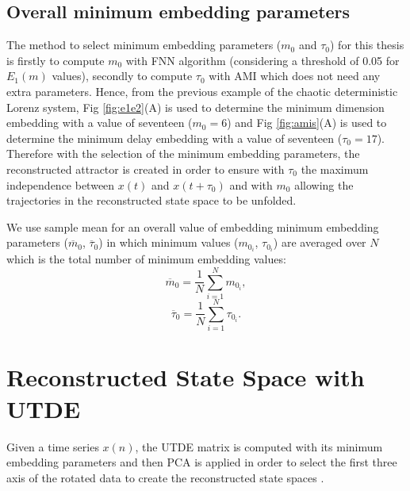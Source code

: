 \subsection{Overall minimum embedding parameters} \label{sec:overall_minMT}
The method to select minimum embedding parameters ($m_0$ and $\tau_0$) 
for this thesis is firstly to compute $m_0$ with FNN algorithm 
(considering a threshold of 0.05 for $E_1(m)$ values), secondly
to compute $\tau_0$ with AMI which does not need any extra parameters.
Hence, from the previous example of the chaotic deterministic 
Lorenz system, Fig \ref{fig:e1e2}(A) is used to determine the minimum 
dimension embedding with a value of seventeen ($m_0 =6$) and 
Fig \ref{fig:amis}(A) is used to determine the minimum delay embedding 
with a value of seventeen ($\tau_0 =17$). 
Therefore with the selection of the minimum embedding parameters, the 
reconstructed attractor is created in order to ensure with $\tau_0$ the 
maximum independence between $x(t)$ and $x(t+\tau_0)$ and with $m_0$ 
allowing the trajectories in the reconstructed state space to be unfolded.

We use sample mean for an overall value of embedding minimum embedding 
parameters ($\overline{m}_0$, $\overline{\tau}_0$) in which minimum values 
($m_{0_i}$, $\tau_{0_i}$) are averaged over $N$ which is the total number 
of minimum embedding values:
\begin{equation}
	\overline{m}_0= \frac{1}{N} \sum^{N}_{i = 1} m_{0_i},
\end{equation}
\begin{equation}
	\overline{\tau}_0= \frac{1}{N} \sum^{N}_{i = 1} \tau_{0_i}.
\end{equation}

\section{Reconstructed State Space with UTDE} \label{sec:rsswithUTDE}

Given a time series $x(n)$, the UTDE matrix is computed with its 
minimum embedding parameters and then PCA is applied in order to select 
the first three axis of the rotated data to create the reconstructed 
state spaces \citep{frank2010, sama2013}.



